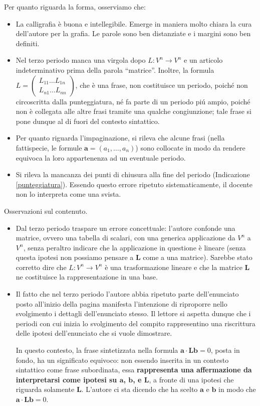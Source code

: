 \documentclass[12pt]{article}
\begin{document}
Per quanto riguarda la forma, osserviamo che:
\begin{itemize}
  \item La calligrafia \`e buona e intellegibile. Emerge in maniera molto chiara la cura dell'autore per la grafia. Le parole sono ben distanziate e i margini sono ben definiti. 
\item  
  Nel terzo periodo manca una virgola dopo $L:V^n\to V^n$  e un articolo indeterminativo prima della parola ``matrice''. Inoltre, la formula $L=\begin{pmatrix}L_{11}\ldots L_{1n}\\L_{n1}\ldots L_{nn}\end{pmatrix}$, che \`e una frase, non costituisce un periodo, poich\'e non circoscritta dalla punteggiatura, n\'e fa parte di un periodo pi\'u ampio, poich\'e non \`e collegata alle altre frasi tramite una qualche congiunzione; tale frase si pone dunque al di fuori del contesto sintattico.
  
\item Per quanto riguarda l'impaginazione, si rileva che alcune frasi (nella fattispecie, le formule $\mathbf a=(a_1,\ldots, a_n)$) sono collocate in modo da rendere equivoca la loro appartenenza ad un eventuale periodo.  

\item Si rileva la mancanza dei punti di chiusura alla fine del  periodo (Indicazione \ref{punteggiatura}). Essendo questo errore ripetuto sistematicamente, il docente non lo interpreta come una svista.
\end{itemize}

Osservazioni sul contenuto.
\begin{itemize}
\item Dal terzo periodo traspare un errore concettuale: l'autore confonde una matrice, ovvero una tabella di scalari, con una generica applicazione da $V^n$ a $V^n$, senza peraltro indicare che la applicazione in questione \`e lineare (senza questa ipotesi non possiamo pensare a $\mathbf L$ come a una matrice). Sarebbe stato corretto dire che $L:V^n\to V^n$ \`e una trasformazione lineare e che la matrice $\mathbf L$ ne costituisce la rappresentazione in una base.

\item Il fatto che nel terzo periodo l'autore abbia ripetuto parte dell'enunciato posto all'inizio della pagina manifesta l'intenzione di riproporre nello svolgimento i dettagli dell'enunciato stesso. Il lettore si aspetta dunque che i periodi con cui inizia lo svolgimento del compito rappresentino una riscrittura delle ipotesi dell'enunciato che si vuole dimostrare.

  In questo contesto, la frase sintetizzata nella formula $\mathbf a\cdot\mathbf L\mathbf b=0$, posta in fondo, ha un significato equivoco: non essendo inserita in un contesto sintattico come frase subordinata, essa {\bf rappresenta una affermazione da interpretarsi come ipotesi su $\mathbf a$, $\mathbf b$, e $\mathbf L$}, a fronte di una ipotesi che riguarda solamente $\mathbf L$. L'autore ci sta dicendo che ha scelto $\mathbf a$ e $\mathbf b$ in modo che $\mathbf a\cdot\mathbf L\mathbf b=0$. 
\end{itemize}
\end{document}
